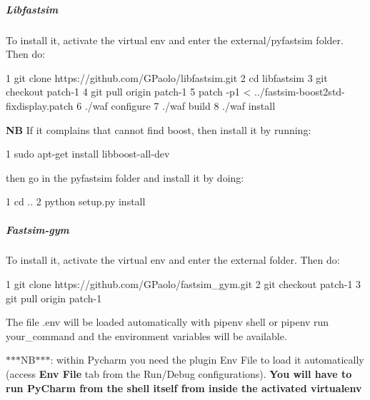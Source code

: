 \subparagraph*{Libfastsim}

To install it, activate the virtual env and enter the {\ttfamily external/pyfastsim} folder. Then do\+: 
\begin{DoxyCode}
1 git clone https://github.com/GPaolo/libfastsim.git
2 cd libfastsim
3 git checkout patch-1
4 git pull origin patch-1
5 patch -p1 < ../fastsim-boost2std-fixdisplay.patch
6 ./waf configure
7 ./waf build
8 ./waf install
\end{DoxyCode}
 {\bfseries NB} If it complains that cannot find boost, then install it by running\+: 
\begin{DoxyCode}
1 sudo apt-get install libboost-all-dev
\end{DoxyCode}


then go in the pyfastsim folder and install it by doing\+: 
\begin{DoxyCode}
1 cd ..
2 python setup.py install
\end{DoxyCode}


\subparagraph*{Fastsim-\/gym}

To install it, activate the virtual env and enter the {\ttfamily external} folder. Then do\+: 
\begin{DoxyCode}
1 git clone https://github.com/GPaolo/fastsim\_gym.git
2 git checkout patch-1
3 git pull origin patch-1
\end{DoxyCode}






The file {\ttfamily .env} will be loaded automatically with {\ttfamily pipenv shell} or {\ttfamily pipenv run your\+\_\+command} and the environment variables will be available.

$\ast$$\ast$$\ast$\+N\+B$\ast$$\ast$$\ast$\+: within Pycharm you need the plugin Env File to load it automatically (access {\bfseries Env File} tab from the Run/\+Debug configurations). {\bfseries You will have to run Py\+Charm from the shell itself from inside the activated virtualenv} 